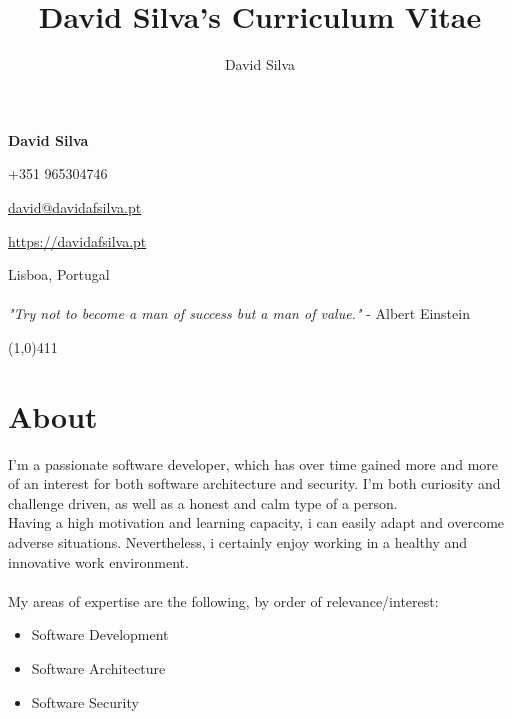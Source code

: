 \documentclass[10pt]{article}
\title{David Silva's Curriculum Vitae}
\author{David Silva}
\newenvironment{listing}{
 \begin{itemize}
  \setlength{\itemsep}{1pt}
  \setlength{\parskip}{0pt}
  \setlength{\parsep}{0pt}
}{\end{itemize}}
\begin{document}
\pagestyle{fancy}

\begin{minipage}[ht]{0.46\textwidth}
    \vspace{-5mm}\Huge{\textbf{David Silva}}
\end{minipage}
\begin{minipage}[ht]{0.46\textwidth}
\hfill +351 965304746

\hfill \href{mailto:david@davidafsilva.pt}{david@davidafsilva.pt}

\hfill \url{https://davidafsilva.pt}
\end{minipage}

\begin{minipage}[ht]{0.925\textwidth}
\vspace{-3mm} Lisboa, Portugal\\\\
\vspace{0 mm} \hfill\footnotesize{
    \textit{"Try not to become a man of success but a man of value."} - Albert Einstein
}
\vspace{0.5mm}
\end{minipage}

\line(1,0){411}
\vspace{2em}

\section*{About}
I'm a passionate software developer, which has over time gained more and more of an interest for both software architecture and security.
I'm both curiosity and challenge driven, as well as a honest and calm type of a person.\\
Having a high motivation and learning capacity, i can easily adapt and overcome adverse situations. Nevertheless, i certainly enjoy working in a healthy and innovative work environment.\\\\
My areas of expertise are the following, by order of relevance/interest:
\begin{listing}
    \item Software Development
    \item Software Architecture
    \item Software Security
\end{listing}
\end{document}
